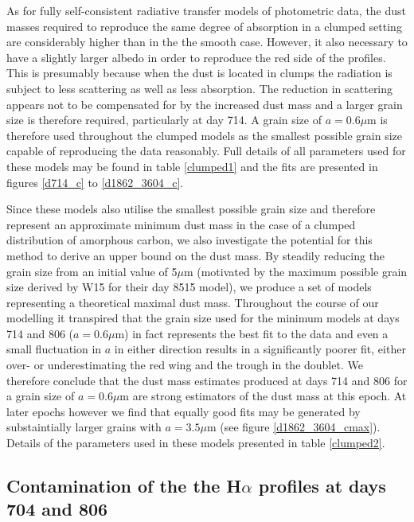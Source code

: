 \documentclass[useAMS,usenatbib,usegraphicx]{mnras}
\begin{document}
As for fully self-consistent radiative transfer models of photometric 
data, the dust masses required to reproduce the same degree of absorption 
in a clumped setting are considerably higher than in the the smooth case.  
However, it also necessary to have a slightly larger albedo in order to 
reproduce the red side of the profiles.  This is presumably because when 
the dust is located in clumps the radiation is subject to less scattering 
as well as less absorption.  The reduction in scattering appears not to be 
compensated for by the increased dust mass and a larger grain size is 
therefore required, particularly at day 714.  A grain size of $a=0.6\mu$m 
is therefore used throughout the clumped models as the smallest possible 
grain size capable of reproducing the data reasonably. Full details of all 
parameters used for these models may be found in table \ref{clumped1} and 
the fits are presented in figures \ref{d714_c} to \ref{d1862_3604_c}.

Since these models also utilise the smallest possible grain size and 
therefore represent an approximate minimum dust mass in the case of a 
clumped distribution of amorphous carbon, we also investigate the 
potential for this method to derive an upper bound on the dust mass.  By 
steadily reducing the grain size from an initial value of 5$\mu$m 
(motivated by the maximum possible grain size derived by W15 for their day 
8515 model), we produce a set of models representing a theoretical maximal 
dust mass.  Throughout the course of our modelling it transpired that the 
grain size used for the minimum models at days 714 and 806 ($a=0.6\mu$m) 
in fact represents the best fit to the data and even a small fluctuation 
in $a$ in either direction results in a significantly poorer fit, either 
over- or underestimating the red wing and the trough in the doublet.  We 
therefore conclude that the dust mass estimates produced at days 714 and 
806 for a grain size of $a=0.6\mu$m are strong estimators of the dust mass 
at this epoch.  At later epochs however we find that equally good fits may 
be generated by substaintially larger grains with $a=3.5\mu$m (see figure 
\ref{d1862_3604_cmax}).  Details of the parameters used in these models 
presented in table \ref{clumped2}.


\subsection{Contamination of the the H$\alpha$ profiles at days 704 and 806}
\end{document}
